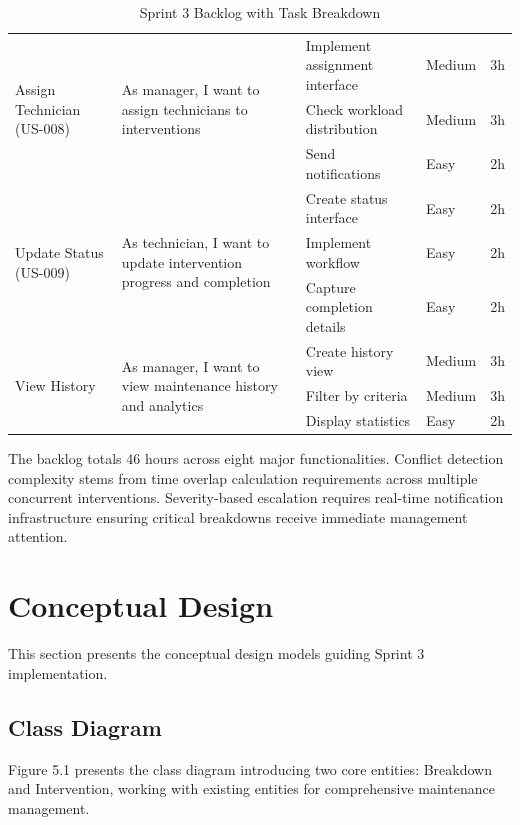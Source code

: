 \begin{table}[H]
\begin{tabular}{|p{2.5cm}|p{4cm}|p{3.2cm}|p{2.2cm}|p{1.5cm}|}
\multirow{3}{2.5cm}{Assign Technician (US-008)} & 
\multirow{3}{4cm}{As manager, I want to assign technicians to interventions}
& Implement assignment interface & Medium & 3h \\
\cline{3-5}
& & Check workload distribution & Medium & 3h \\
\cline{3-5}
& & Send notifications & Easy & 2h \\
\hline

\multirow{3}{2.5cm}{Update Status (US-009)} & 
\multirow{3}{4cm}{As technician, I want to update intervention progress and completion}
& Create status interface & Easy & 2h \\
\cline{3-5}
& & Implement workflow & Easy & 2h \\
\cline{3-5}
& & Capture completion details & Easy & 2h \\
\hline

\multirow{3}{2.5cm}{View History} & 
\multirow{3}{4cm}{As manager, I want to view maintenance history and analytics}
& Create history view & Medium & 3h \\
\cline{3-5}
& & Filter by criteria & Medium & 3h \\
\cline{3-5}
& & Display statistics & Easy & 2h \\
\hline

\end{tabular}
\caption{Sprint 3 Backlog with Task Breakdown}
\label{tab:sprint3_backlog}
\end{table}

The backlog totals 46 hours across eight major functionalities. Conflict detection complexity stems from time overlap calculation requirements across multiple concurrent interventions. Severity-based escalation requires real-time notification infrastructure ensuring critical breakdowns receive immediate management attention.

\section{Conceptual Design}

This section presents the conceptual design models guiding Sprint 3 implementation.

\subsection{Class Diagram}

Figure 5.1 presents the class diagram introducing two core entities: Breakdown and Intervention, working with existing entities for comprehensive maintenance management.

